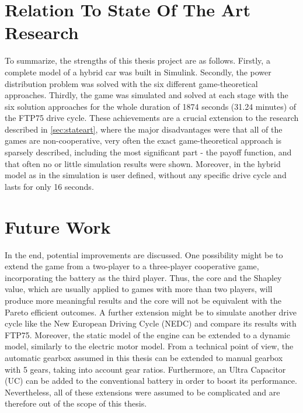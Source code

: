 \section{Relation To State Of The Art Research}
To summarize, the strengths of this thesis project are as follows. Firstly, a complete model of a hybrid car was built in Simulink. Secondly, the power distribution problem was solved with the six different game-theoretical approaches. Thirdly, the game was simulated and solved at each stage with the six solution approaches for the whole duration of 1874 seconds (31.24 minutes) of the FTP75 drive cycle. These achievements are a crucial extension to the research described in \ref{sec:stateart}, where the major disadvantages were that all of the games are non-cooperative, very often the exact game-theoretical approach is sparsely described, including the most significant part - the payoff function, and that often no or little simulation results were shown. Moreover, in the hybrid model as in \citet{hevMatlab} the simulation is user defined, without any specific drive cycle and lasts for only 16 seconds.

\section{Future Work}
In the end, potential improvements are discussed. One possibility might be to extend the game from a two-player to a three-player cooperative game, incorporating the battery as the third player. Thus, the core and the Shapley value, which are usually applied to games with more than two players, will produce more meaningful results and the core will not be equivalent with the Pareto efficient outcomes. A further extension might be to simulate another drive cycle like the New European Driving Cycle (NEDC) and compare its results with FTP75. Moreover, the static model of the engine can be extended to a dynamic model, similarly to the electric motor model. From a technical point of view, the automatic gearbox assumed in this thesis can be extended to manual gearbox with 5 gears, taking into account gear ratios. Furthermore, an Ultra Capacitor (UC) can be added to the conventional battery in order to boost its performance. Nevertheless, all of these extensions were assumed to be complicated and are therefore out of the scope of this thesis.

